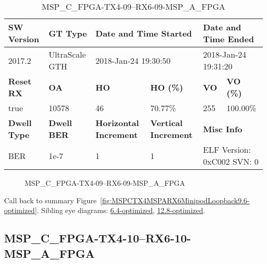 \begin{table}[h]
\centering
\caption{MSP\_C\_FPGA-TX4-09--RX6-09-MSP\_A\_FPGA}
\label{tab:MSPCFPGATX409RX609MSPAFPGA9.6-optimized}
\begin{tabular}{@{}|l|l|l|l|l|l|@{}}
\toprule
\textbf{SW Version}                & \textbf{GT Type}   & \multicolumn{2}{l|}{\textbf{Date and Time Started}}            & \multicolumn{2}{l|}{\textbf{Date and Time Ended}}        \\ \midrule
2017.2                       & UltraScale GTH          & \multicolumn{2}{l|}{2018-Jan-24 19:30:50}                   & \multicolumn{2}{l|}{2018-Jan-24 19:31:20}               \\ \midrule
\textbf{Reset RX}                  & \textbf{OA} & \textbf{HO}   & \textbf{HO (\%)} & \textbf{VO} & \textbf{VO (\%)} \\ \midrule
true & 10578        & 46          & 70.77\%        & 255        & 100.00\%       \\ \midrule
\textbf{Dwell Type}                & \textbf{Dwell BER} & \textbf{Horizontal Increment} & \textbf{Vertical Increment}    & \multicolumn{2}{l|}{\textbf{Misc Info}}                  \\ \midrule
BER                            & 1e-7        & 1        & 1           & \multicolumn{2}{l|}{ELF Version: 0xC002 SVN: 0}                         \\ \bottomrule
\end{tabular}
\end{table}

\begin{figure}[h]
\caption{MSP\_C\_FPGA-TX4-09--RX6-09-MSP\_A\_FPGA} \label{fig:MSPCFPGATX409RX609MSPAFPGA9.6-optimized}
\end{figure}

Call back to summary Figure~\ref{fig:MSPCTX4MSPARX6MinipodLoopback9.6-optimized}.
Sibling eye diagrams: \hyperref[sec:MSPCFPGATX409RX609MSPAFPGA6.4-optimized]{6.4-optimized}, \hyperref[sec:MSPCFPGATX409RX609MSPAFPGA12.8-optimized]{12.8-optimized}.

\clearpage
\newpage


\subsection{MSP\_C\_FPGA-TX4-10--RX6-10-MSP\_A\_FPGA}\label{sec:MSPCFPGATX410RX610MSPAFPGA9.6-optimized}

